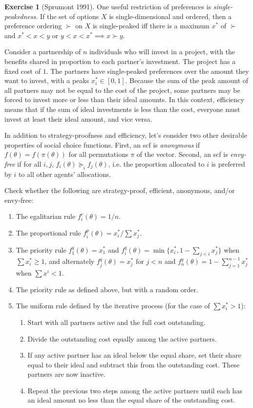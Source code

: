 \documentclass[letter, 10pt]{article}
\theoremstyle{definition}
\newtheorem{exercise}{Exercise}[section]
\begin{document}
\begin{spacing}{1.1}
\begin{exercise}[Sprumont 1991]
  One useful restriction of preferences is \emph{single-peakedness}. If the
  set of options $X$ is single-dimensional and ordered, then a preference
  ordering $\succ$ on $X$ is single-peaked iff there is a maximum $x^*$ of
  $\succ$ and $x^* < x < y$ or $y < x < x^* \implies x \succ y$.

  Consider a partnership of $n$ individuals who will invest in a project,
  with the benefits shared in proportion to each partner's investment. The
  project has a fixed cost of $1$. The partners have single-peaked
  preferences over the amount they want to invest, with a peaks $x_i^* \in
  [0,1]$. Because the sum of the peak amount of all partners may not be
  equal to the cost of the project, some partners may be forced to invest
  more or less than their ideal amounts. In this context, efficiency means
  that if the sum of ideal investments is less than the cost, everyone must
  invest at least their ideal amount, and vice versa.

  In addition to strategy-proofness and efficiency, let's consider two
  other desirable properties of social choice functions. First, an scf is
  \emph{anonymous} if $f(\theta)=f(\pi(\theta))$ for all permutations $\pi$
  of the vector. Second, an scf is \emph{envy-free} if for all $i,j$,
  $f_i(\theta) \succeq_i f_j(\theta)$, i.e. the proportion allocated to $i$
  is preferred by $i$ to all other agents' allocations.

  Check whether the following are strategy-proof,
  efficient, anonymous, and/or envy-free:
  \begin{enumerate}
  \item The egalitarian rule $f_i^e(\theta) = 1/n$.
  \item The proportional rule $f_i^p(\theta) = x_i^*/\sum x_j^*$.
  \item The priority rule $f_1^q(\theta) = x_1^*$ and
    $f_i^q(\theta) = \min\{x_i^*, 1-\sum_{j<i} x_j^*\}$
    when $\sum x_i^* \geq 1$, and alternately $f_j^q(\theta) = x_j^*$
    for $j < n$ and $f_n^q(\theta) = 1 - \sum_{j=1}^{n-1}
    x_j^*$ when $\sum x^i < 1$.
  \item The priority rule as defined above, but with a random order.
  \item The uniform rule defined by the iterative process (for the case of
    $\sum x_i^* > 1$):
    \begin{enumerate}
    \item Start with all partners active and the full cost outstanding.
    \item Divide the outstanding cost equally among the active partners.
    \item If any active partner has an ideal below the equal
      share, set their share equal to their ideal and
      subtract this from the outstanding cost. These
      partners are now inactive.
    \item Repeat the previous two steps among the active
      partners until each has an ideal amount no less
      than the equal share of the outstanding cost.
    \end{enumerate}


\end{enumerate}
\end{exercise}
\end{spacing}
\end{document}

